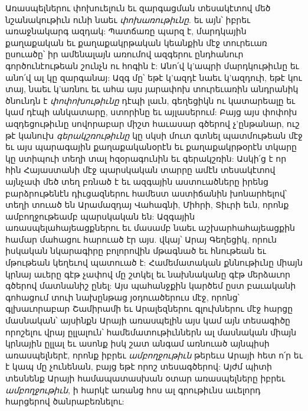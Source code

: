 \documentclass{article}
\begin{document}
{Առասպելներու փոխուելուն եւ զարգացման տեսակէտով մեծ նշանակութիւն ունի նաեւ \emph{փոխառութիւնը}. եւ այն՝ իբրեւ առաջնակարգ ազդակ: Պատճառը պարզ է, մարդկային քաղաքական եւ քաղաքակրթական կեանքին մէջ տուրեւառ ըսուածը՝ իր ամենալայն առումով ազգերու ընդհանուր գործունէութեան շունչն ու հոգին է: Անո՛վ կ'ապրի մարդկութիւնը եւ անո՛վ ալ կը զարգանայ: Ազգ մը՝ եթէ կ'ազդէ նաեւ կ'ազդուի, եթէ կու տայ, նաեւ կ'առնու եւ ահա այս յարափոխ տուրեւառին անդրանիկ ծնունդն է \emph{փոփոխութիւնը} դէպի լաւն, գեղեցիկն ու կատարեալը եւ կամ դէպի անկատարը, ստորինը եւ այլասերում: Բայց այս փոփոխ ազդեցութիւնը սովորաբար միշտ հաւասար գծերով չ'ընթանար, ուշ թէ կանուխ \emph{գերակշռութիւնը} կը սկսի մուտ գտնել պատմութեան մէջ եւ այս պարագային քաղաքականօրէն եւ քաղաքակրթօրէն տկարը կը ստիպուի տեղի տալ հզօրագունին եւ գերակշռին: Ասկի՛ց է որ հին Հայաստանի մէջ պարսկական տարրը ամէն տեսակէտով այնչափ մեծ տեղ բռնած է եւ ազգային աստուածները իրենց բարձրութենէն դիւցազներու համեստ աստիճանին խոնարհելով՝ տեղի տուած են Արամազդայ Վահագնի, Միհրի, Տիւրի եւն, որոնք ամբողջութեամբ պարսկական են: Ազգային առասպելահայեացքներու եւ մասամբ նաեւ աշխարհահայեացքին համար մահացու հարուած էր այս. վկայ՝ Արայ Գեղեցիկ, որուն իսկական նկարագիրը բոլորովին մթագնած եւ հնութեան եւ մթութեան կեղեւով պատուած է: Համեմատական քննութիւնը միայն կրնայ աւերը գէթ չափով մը շտկել եւ նախնականը գէթ մերձաւոր գծերով մատնանիշ ընել: Այս պահանջքին կարծեմ ըստ բաւականի գոհացում տուի նախընթաց յօդուածերուս մէջ, որոնց՝ գլխաւորաբար Շամիրամի եւ Արալեզներու գլուխներու մէջ հարցը մասնական՝ այսինքն Արայի առասպելին այս կամ այն տեսագիծը որոշելու վրայ ըլլալուն՝ համեմատութիւններն ալ մասնական միայն կրնային ըլլալ եւ ասոնք իսկ շատ անգամ առնուած այնպիսի առասպելներէ, որոնք իբրեւ \emph{ամբողջութիւն} թերեւս Արայի հետ ո՛ր եւ է կապ մը չունենան, բայց եթէ որոշ տեսագծերով: Այժմ պիտի տեսնենք Արայի համապատասխան օտար առասպելները իբրեւ \emph{ամբողջութիւն}, ի հարկէ առանց հոս ալ գրութիւնս աւելորդ հարցերով ծանրաբեռնելու:

}
\end{document}

